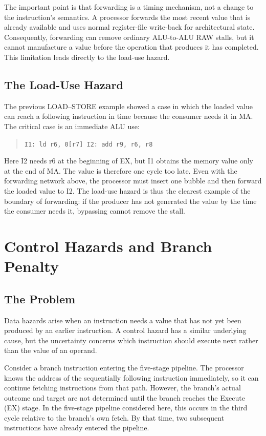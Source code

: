 \documentclass[11pt,a4paper]{report}
\begin{document}
The important point is that forwarding is a timing mechanism, not a change to the instruction's semantics. A processor forwards the most recent value that is already available and uses normal register-file write-back for architectural state. Consequently, forwarding can remove ordinary ALU-to-ALU RAW stalls, but it cannot manufacture a value before the operation that produces it has completed. This limitation leads directly to the load-use hazard.

\subsection{The Load-Use Hazard}

The previous LOAD--STORE example showed a case in which the loaded value can reach a following instruction in time because the consumer needs it in MA. The critical case is an immediate ALU use:

\begin{quote}
\texttt{I1: ld r6, 0[r7] \quad I2: add r9, r6, r8}
\end{quote}

Here I2 needs r6 at the beginning of EX, but I1 obtains the memory value only at the end of MA. The value is therefore one cycle too late. Even with the forwarding network above, the processor must insert one bubble and then forward the loaded value to I2. The load-use hazard is thus the clearest example of the boundary of forwarding: if the producer has not generated the value by the time the consumer needs it, bypassing cannot remove the stall.~\cite{hennessy}

\section{Control Hazards and Branch Penalty}
\label{sec:control-hazards}

\subsection{The Problem}

Data hazards arise when an instruction needs a value that has not yet been produced by an earlier instruction. A control hazard has a similar underlying cause, but the uncertainty concerns which instruction should execute next rather than the value of an operand.

Consider a branch instruction entering the five-stage pipeline. The processor knows the address of the sequentially following instruction immediately, so it can continue fetching instructions from that path. However, the branch's actual outcome and target are not determined until the branch reaches the Execute (EX) stage. In the five-stage pipeline considered here, this occurs in the third cycle relative to the branch's own fetch. By that time, two subsequent instructions have already entered the pipeline.
\end{document}
